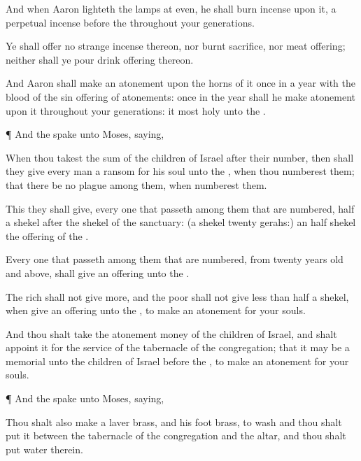 {And when
Aaron
lighteth the
lamps at
even, he shall burn
incense upon it, a
perpetual
incense
before the
{} throughout your
generations.

Ye shall
offer no
strange
incense thereon, nor burnt
sacrifice, nor meat
offering; neither shall ye
pour drink
offering thereon.

And
Aaron shall make an
atonement upon the
horns of it
once in a
year with the
blood of the sin
offering of
atonements:
once in the
year shall he make
atonement upon it throughout your
generations: it
{}
most
holy unto the
{}.


\par }{\PP {}¶ And the
{}
spake unto
Moses,
saying,

When thou
takest the
sum of the
children of
Israel after their
number, then shall they
give every
man a
ransom for his
soul unto the
{}, when thou
numberest them; that there be no
plague among them, when
{}
numberest them.

This they shall
give, every one that
passeth
among them that are
numbered,
half a
shekel after the
shekel of the
sanctuary: (a
shekel
{}
twenty
gerahs:) an
half
shekel
{} the
offering of the
{}.

Every one that
passeth among them that are
numbered, from
twenty
years
old and
above, shall
give an
offering unto the
{}.

The
rich shall not give
more, and the
poor shall not give
less than
half a
shekel, when
{}
give an
offering unto the
{}, to make an
atonement for your
souls.

And thou shalt
take the
atonement
money of the
children of
Israel, and shalt
appoint it for the
service of the
tabernacle of the
congregation; that it may be a
memorial unto the
children of
Israel
before the
{}, to make an
atonement for your
souls.


\par }{\PP {}¶ And the
{}
spake unto
Moses,
saying,

Thou shalt also
make a
laver
{}
brass, and his
foot
{}
brass, to
wash
{} and thou shalt
put it between the
tabernacle of the
congregation and the
altar, and thou shalt
put
water therein.

}
